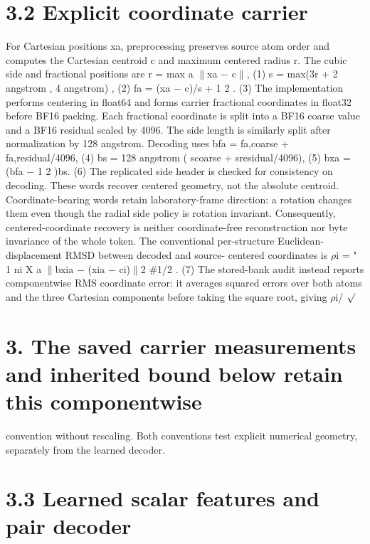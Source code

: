 \documentclass[11pt]{article}
\begin{document}
\section*{3.2 Explicit coordinate carrier}

For Cartesian positions xa, preprocessing preserves source atom order and computes the Cartesian
centroid c and maximum centered radius r. The cubic side and fractional positions are
r = max
a
\ensuremath{\parallel}xa \ensuremath{-} c\ensuremath{\parallel}, (1)
s = max(3r + 2 angstrom , 4 angstrom) , (2)
fa = (xa \ensuremath{-} c)/s + 1
2 . (3)
The implementation performs centering in float64 and forms carrier fractional coordinates in float32
before BF16 packing. Each fractional coordinate is split into a BF16 coarse value and a BF16
residual scaled by 4096. The side length is similarly split after normalization by 128 angstrom.
Decoding uses
bfa = fa,coarse + fa,residual/4096, (4)
bs = 128 angstrom ( scoarse + sresidual/4096), (5)
bxa = (bfa \ensuremath{-} 1
2 )bs. (6)
The replicated side header is checked for consistency on decoding. These words recover centered
geometry, not the absolute centroid. Coordinate-bearing words retain laboratory-frame direction:
a rotation changes them even though the radial side policy is rotation invariant. Consequently,
centered-coordinate recovery is neither coordinate-free reconstruction nor byte invariance of the
whole token.
The conventional per-structure Euclidean-displacement RMSD between decoded and source-
centered coordinates is
\ensuremath{\rho}i =
"
1
ni
X
a
\ensuremath{\parallel}bxia \ensuremath{-} (xia \ensuremath{-} ci)\ensuremath{\parallel}2
\#1/2
. (7)
The stored-bank audit instead reports componentwise RMS coordinate error: it averages squared
errors over both atoms and the three Cartesian components before taking the square root, giving
\ensuremath{\rho}i/
\ensuremath{\surd}

\section*{3. The saved carrier measurements and inherited bound below retain this componentwise}

convention without rescaling. Both conventions test explicit numerical geometry, separately from
the learned decoder.

\section*{3.3 Learned scalar features and pair decoder}
\end{document}
